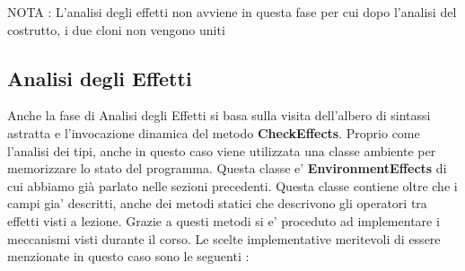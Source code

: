 \documentclass{article}
\begin{document}
\begin{itemize}
    NOTA : L'analisi degli effetti non avviene in questa fase per cui dopo l'analisi del costrutto, i due cloni non vengono uniti
\end{itemize}

\subsection{Analisi degli Effetti}

Anche la fase di Analisi degli Effetti si basa sulla visita dell'albero di sintassi astratta e l'invocazione dinamica del metodo \textbf{CheckEffects}. Proprio come l'analisi dei tipi, anche in questo caso viene utilizzata una classe ambiente per memorizzare lo stato del programma. Questa classe e' \textbf{EnvironmentEffects} di cui abbiamo già parlato nelle sezioni precedenti. Questa classe contiene oltre che i campi gia' descritti, anche dei metodi statici che descrivono gli operatori tra effetti visti a lezione. Grazie a questi metodi si e' proceduto ad implementare i meccanismi visti durante il corso. Le scelte implementative meritevoli di essere menzionate in questo caso sono le seguenti : \\
\end{document}
